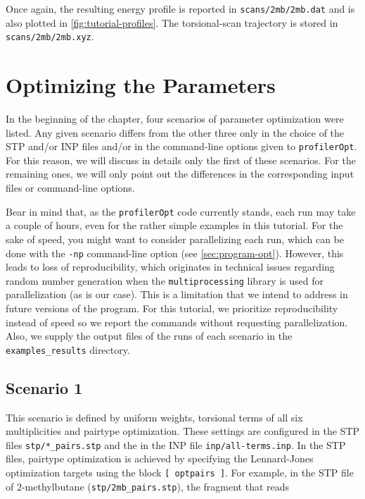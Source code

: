 \documentclass[10pt,a4paper,openany]{memoir}
\numberwithin{equation}{section}
\newcommand{\under}{\_}
\newcommand{\profileropt}[0]{\texttt{profilerOpt}}
\begin{document}
\noindent Once again, the resulting energy profile is reported in
\texttt{scans/2mb/2mb.dat} and is also plotted in
\autoref{fig:tutorial-profiles}.
%
The torsional-scan trajectory is stored in \texttt{scans/2mb/2mb.xyz}.
%

\section{Optimizing the Parameters}
\label{sec:tutorial-profileropt}

In the beginning of the chapter, four scenarios of parameter
optimization were listed.
%
Any given scenario differs from the other three only in the choice of
the STP and/or INP files and/or in the command-line options given to
\profileropt{}.
%
For this reason, we will discuss in details only the first of these
scenarios.
%
For the remaining ones, we will only point out the differences in the
corresponding input files or command-line options.
%

Bear in mind that, as the \profileropt{} code currently stands, each
run may take a couple of hours, even for the rather simple examples in
this tutorial.
%
For the sake of speed, you might want to consider parallelizing each
run, which can be done with the \texttt{-np} command-line option (see
\autoref{sec:program-opt}).
%
However, this leads to loss of reproducibility, which originates in
technical issues regarding random number generation when the
\texttt{multiprocessing} library is used for parallelization (as is
our case).
%
This is a limitation that we intend to address in future versions of
the program.
%
For this tutorial, we prioritize reproducibility instead of speed so
we report the commands without requesting parallelization.
%
Also, we supply the output files of the runs of each scenario in the
\texttt{examples\_results} directory.

\subsection{Scenario 1}
\label{sec:tutorial-scenario-1}

This scenario is defined by uniform weights, torsional terms of all
six multiplicities and pairtype optimization.
%
These settings are configured in the STP files
\texttt{stp/*\under{}pairs.stp} and the in the INP file
\texttt{inp/all-terms.inp}.
%
In the STP files, pairtype optimization is achieved by specifying the
Lennard-Jones optimization targets using the block
\texttt{[~optpairs~]}.
%
%
For example, in the STP file of 2-methylbutane
(\texttt{stp/2mb\under{}pairs.stp}), the fragment that reads
\end{document}
